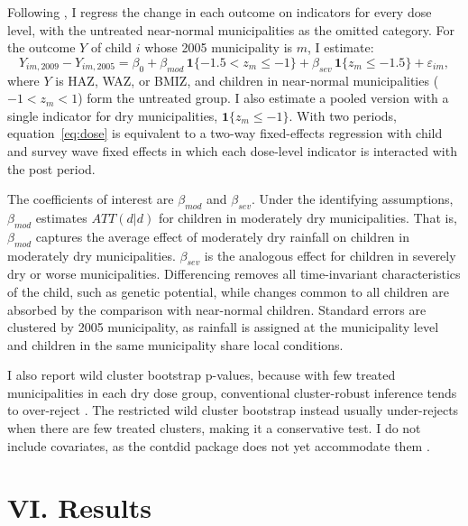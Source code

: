 Following \textcite{callawayDifferenceinDifferencesContinuousTreatment2024}, I regress the change in each outcome on indicators for every dose level, with the untreated near-normal municipalities as the omitted category. For the outcome $Y$ of child $i$ whose 2005 municipality is $m$, I estimate:
\begin{equation}
Y_{im,2009} - Y_{im,2005} = \beta_0 + \beta_{mod}\,\mathbf{1}\{-1.5 < z_m \le -1\} + \beta_{sev}\,\mathbf{1}\{z_m \le -1.5\} + \varepsilon_{im}, \label{eq:dose}
\end{equation}
where $Y$ is HAZ, WAZ, or BMIZ, and children in near-normal municipalities ($-1 < z_m < 1$) form the untreated group. I also estimate a pooled version with a single indicator for dry municipalities, $\mathbf{1}\{z_m \le -1\}$. With two periods, equation~\eqref{eq:dose} is equivalent to a two-way fixed-effects regression with child and survey wave fixed effects in which each dose-level indicator is interacted with the post period.

The coefficients of interest are $\beta_{mod}$ and $\beta_{sev}$. Under the identifying assumptions, $\beta_{mod}$ estimates $ATT(d|d)$ for children in moderately dry municipalities. That is, $\beta_{mod}$ captures the average effect of moderately dry rainfall on children in moderately dry municipalities. $\beta_{sev}$ is the analogous effect for children in severely dry or worse municipalities. Differencing removes all time-invariant characteristics of the child, such as genetic potential, while changes common to all children are absorbed by the comparison with near-normal children. Standard errors are clustered by 2005 municipality, as rainfall is assigned at the municipality level and children in the same municipality share local conditions.

I also report wild cluster bootstrap p-values, because with few treated municipalities in each dry dose group, conventional cluster-robust inference tends to over-reject \parencite{mackinnonClusterrobustInferenceGuide2023}. The restricted wild cluster bootstrap instead usually under-rejects when there are few treated clusters, making it a conservative test. I do not include covariates, as the contdid package does not yet accommodate them \parencite{callawayDifferenceinDifferencesContinuousTreatment2026}.

\section*{VI. Results}\label{sec:VI}

